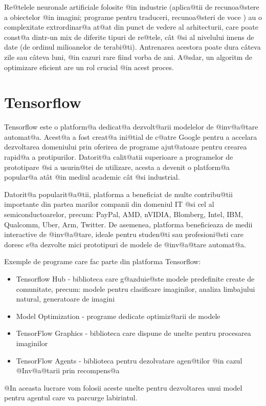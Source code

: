 Re@telele neuronale artificiale folosite @in industrie (aplica@tii de recunoa@stere a obiectelor @in imagini; programe pentru traduceri, recunoa@steri de voce ) au o complexitate extrordinar@a at@at din punct de vedere al arhitecturii, care poate const@a dintr-un mix de diferite tipuri de re@tele, c\^ at @si al nivelului imens de date (de ordinul milioanelor de terabi@ti). Antrenarea acestora poate dura c\^ ateva zile sau c\^ ateva luni, @in cazuri rare fiind vorba de ani. A@sdar, un algoritm de optimizare eficient are un rol crucial @in acest proces.

\section{Tensorflow}
Tensorflow este o platform@a dedicat@a dezvolt@arii modelelor de @inv@a@tare automat@a. Acest@a a fost creat@a ini@tial de c@atre Google pentru a accelara dezvoltarea domeniului prin oferirea de programe ajut@atoare pentru crearea rapid@a a protipurilor. Datorit@a calit@atii superioare a programelor de prototipare @si a usurin@tei de utilizare, acesta a devenit o platform@a popular@a at\^ at @in mediul academic c\^ at @si industrial.

Datorit@a popularit@a@tii, platforma a beneficiat de multe contribu@tii importante din partea marilor companii din domeniul IT @si cel al semiconductoarelor, precum: PayPal, AMD, nVIDIA, Blomberg, Intel, IBM, Qualcomm, Uber, Arm, Twitter. De asemenea, platforma beneficieaza de medii interactive de @inv@a@tare, ideale pentru studen@ti sau profesioni@sti care doresc s@a dezvolte mici prototipuri de modele de @inv@a@tare automat@a.

Exemple de programe care fac parte din platforma Tensorflow:
\begin{itemize}
	\item Tensorflow Hub - biblioteca care g@azduie@ste modele predefinite create de comunitate, precum: modele pentru clasificare imaginilor, analiza limbajului natural, generatoare de imagini
	\item Model Optimization - programe dedicate optimiz@arii de modele
	\item TensorFlow Graphics - biblioteca care dispune de unelte pentru procesarea imaginilor
	\item TensorFlow Agents - biblioteca pentru dezolvatare agen@tilor @in cazul @Inv@a@tarii prin recompens@a
\end{itemize}

@In aceasta lucrare vom folosii aceste unelte pentru dezvoltarea unui model pentru agentul care va parcurge labirintul.

